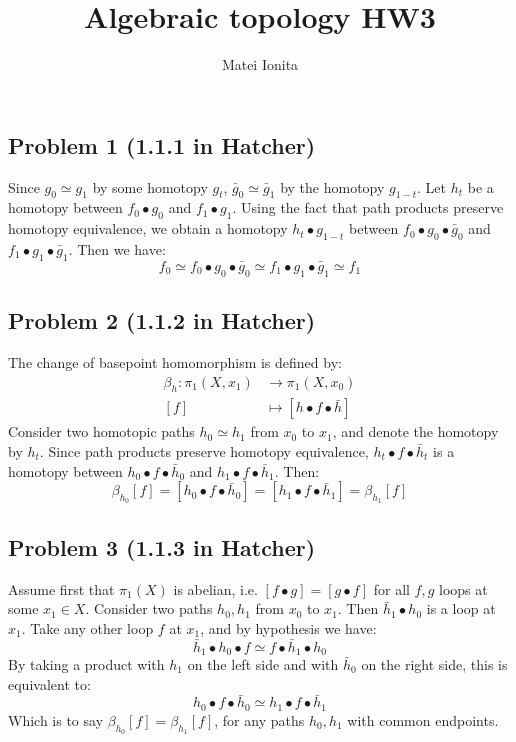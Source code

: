 \documentclass[12 pt]{article}
\title{Algebraic topology HW3}
\author{Matei Ionita}
\begin{document}
  \maketitle

\subsection*{Problem 1 (1.1.1 in Hatcher)}
Since $g_0 \simeq g_1$ by some homotopy $g_t$, $\bar g_0 \simeq \bar g_1$ by the homotopy $g_{1-t}$. Let $h_t$ be a homotopy between $f_0 \bullet g_0$ and $f_1 \bullet g_1$. Using the fact that path products preserve homotopy equivalence, we obtain a homotopy $h_t \bullet g_{1-t}$ between $f_0 \bullet g_0 \bullet \bar g_0$ and $f_1 \bullet g_1 \bullet \bar g_1$. Then we have:
\[         f_0 \simeq   f_0 \bullet g_0 \bullet \bar g_0 \simeq  f_1 \bullet g_1 \bullet \bar g_1 \simeq f_1      \]

\subsection*{Problem 2 (1.1.2 in Hatcher)}
The change of basepoint homomorphism is defined by:
\begin{align*}
\beta_h : \pi_1 (X, x_1) &\to \pi_1 (X, x_0) \\
 [f] &\mapsto [h \bullet f \bullet \bar h]
\end{align*}
Consider two homotopic paths $h_0 \simeq h_1$ from $x_0$ to $x_1$, and denote the homotopy by $h_t$. Since path products preserve homotopy equivalence, $h_t \bullet f \bullet \bar h_t$ is a homotopy between $h_0 \bullet f \bullet \bar h_0$ and $h_1 \bullet f \bullet \bar h_1$. Then:
\[        \beta_{h_0} [f] = [ h_0 \bullet f \bullet \bar h_0 ] = [h_1 \bullet f \bullet \bar h_1] = \beta_{h_1} [f]    \]

\subsection*{Problem 3 (1.1.3 in Hatcher)}
Assume first that $\pi_1(X)$ is abelian, i.e. $[f\bullet g] = [g\bullet f]$ for all $f,g$ loops at some $x_1 \in X$. Consider two paths $h_0, h_1$ from $x_0$ to $x_1$. Then $\bar h_1 \bullet h_0$ is a loop at $x_1$. Take any other loop $f$ at $x_1$, and by hypothesis we have:
\[      \bar h_1 \bullet h_0 \bullet f \simeq f \bullet \bar h_1 \bullet h_0        \]
By taking a product with $h_1$ on the left side and with $\bar h_0$ on the right side, this is equivalent to:
\[        h_0 \bullet f \bullet \bar h_0 \simeq h_1 \bullet f \bullet \bar h_1         \]
Which is to say $\beta_{h_0} [f] = \beta_{h_1} [f]$, for any paths $h_0, h_1$ with common endpoints.
\end{document}
